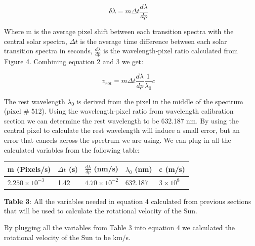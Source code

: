 \documentclass[onecolumn, 12pt, a4paper]{article}
\begin{document}
\begin{equation}\label{eq:3}
\delta \lambda = m \Delta t \dfrac{d\lambda}{dp}
\end{equation}
\begin{flushleft}
Where m is the average pixel shift between each transition spectra with the central solar spectra, $\Delta t$ is the average time difference between each solar transition spectra in seconds, $\frac{d\lambda}{dp}$ is the wavelength-pixel ratio calculated from Figure 4. Combining equation 2 and 3 we get:
\end{flushleft}
\begin{equation}\label{eq:4}
v_{rot} = m \Delta t \dfrac{d\lambda}{dp} \dfrac{1}{\lambda_0} c
\end{equation}
\begin{flushleft}
 The rest wavelength  $\lambda_0$ is derived from the pixel in the middle of the spectrum (pixel # 512). Using the wavelength-pixel ratio from wavelength calibration section we can determine the rest wavelength to be 632.187 nm. By using the central pixel to calculate the rest wavelength will induce a small error, but an error that cancels across the spectrum we are using. We can plug in all the calculated variables from the following table: \newline
\end{flushleft}
\newline

\hspace*{1cm}\begin{tabular}{ |p{2.7cm}|p{1.6cm}|p{2.5cm}|p{2cm}|p{2cm}| }
 \hline
  m (Pixels/s) & $\Delta t$ (s) & $\frac{d\lambda}{dp}$ (nm/s) & $\lambda_0$ (nm) & c (m/s) \\
 \hline
 $2.250 \times 10^{-3}$ & 1.42 & $4.70 \times 10^{-2}$ & 632.187 & $3 \times 10^8$ \\
 \hline
\end{tabular}
\leavevmode
\newline 
\newline

\textbf{Table 3}: All the variables needed in equation 4 calculated from previous sections that will be used to calculate the rotational velocity of the Sun.

\begin{flushleft}
By plugging all the variables from Table 3 into equation 4 we calculated the rotational velocity of the Sun to be  km/s.
\end{flushleft}
\end{document}
